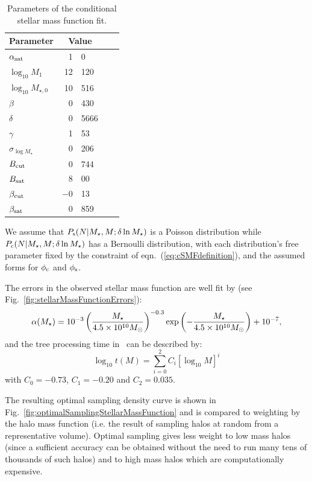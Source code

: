 \begin{table}
\begin{center}
\caption{Parameters of the conditional stellar mass function fit.}
\label{tb:z0SMFFitParameters}
\begin{tabular}{lr@{.}lr@{.}l}
\hline
{\bf Parameter} & \multicolumn{2}{c}{\bf Value} \\
\hline
$\alpha_{\rm sat}$& 1&0 \\
$\log_{10} M_1$& 12&120 \\
$\log_{10} M_{\star,0}$& 10&516 \\
$\beta$& 0&430 \\
$\delta$& 0&5666 \\
$\gamma$& 1&53 \\
$\sigma_{\log M_\star}$& 0&206 \\
$B_{\rm cut}$& 0&744 \\
$B_{\rm sat}$& 8&00 \\
$\beta_{\rm cut}$& $-$0&13 \\
$\beta_{\rm sat}$& 0&859 \\
\hline
\end{tabular}
\end{center}
\end{table}

We assume that $P_{\rm s}(N|M_\star,M;\delta \ln M_\star)$ is a Poisson distribution while $P_{\rm c}(N|M_\star,M;\delta \ln M_\star)$ has a Bernoulli distribution, with each distribution's free parameter fixed by the constraint of eqn.~(\ref{eq:cSMFdefinition}), and the assumed forms for $\phi_{\rm c}$ and $\phi_{\rm s}$.

The errors in the \cite{li_distribution_2009} observed stellar mass function are well fit by (see Fig.~\ref{fig:stellarMassFunctionErrors}):
\begin{equation}
 \alpha(M_\star) = 10^{-3} \left({M_\star\over 4.5\times 10^{10}M_\odot}\right)^{-0.3} \exp\left(-{M_\star\over 4.5\times 10^{10}M_\odot}\right) + 10^{-7},
 \label{eq:stellarMassFunctionErrorsFit}
\end{equation}
and the tree processing time in \glc\ can be described by:
\begin{equation}
 \log_{10} t(M) = \sum_{i=0}^2 C_i [ \log_{10} M ]^i
\end{equation}
with $C_0=-0.73$, $C_1=-0.20$ and $C_2=0.035$.

The resulting optimal sampling density curve is shown in Fig.~\ref{fig:optimalSamplingStellarMassFunction} and is compared to weighting by the halo mass function (i.e. the result of sampling halos at random from a representative volume). Optimal sampling gives less weight to low mass halos (since a sufficient accuracy can be obtained without the need to run many tens of thousands of such halos) and to high mass halos which are computationally expensive. 

